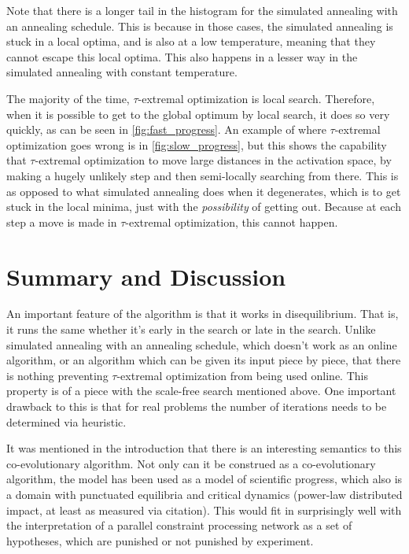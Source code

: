 \documentclass[12pt]{article}
\begin{document}
Note that there is a longer tail in the histogram for the simulated annealing with an annealing schedule. This is because in those cases, the simulated annealing is stuck in a local optima, and is also at a low temperature, meaning that they cannot escape this local optima. This also happens in a lesser way in the simulated annealing with constant temperature.

The majority of the time, $\tau$-extremal optimization is local search. Therefore, when it is possible to get to the global optimum by local search, it does so very quickly, as can be seen in \ref{fig:fast_progress}. An example of where $\tau$-extremal optimization goes wrong is in \ref{fig:slow_progress}, but this shows the capability that $\tau$-extremal optimization to move large distances in the activation space, by making a hugely unlikely step and then semi-locally searching from there. This is as opposed to what simulated annealing does when it degenerates, which is to get stuck in the local minima, just with the \emph{possibility} of getting out. Because at each step a move is made in $\tau$-extremal optimization, this cannot happen.

\section{Summary and Discussion}
An important feature of the algorithm is that it works in disequilibrium\cite{boettcher}. That is, it runs the same whether it's early in the search or late in the search. Unlike simulated annealing with an annealing schedule, which doesn't work as an online algorithm, or an algorithm which can be given its input piece by piece, that there is nothing preventing $\tau$-extremal optimization from being used online. This property is of a piece with the scale-free search mentioned above. One important drawback to this is that for real problems the number of iterations needs to be determined via heuristic.

It was mentioned in the introduction that there is an interesting semantics to this co-evolutionary algorithm. Not only can it be construed as a co-evolutionary algorithm, the model has been used as a model of scientific progress\cite{bakscience}, which also is a domain with punctuated equilibria and critical dynamics (power-law distributed impact, at least as measured via citation\cite{citationpowerlaw}). This would fit in surprisingly well with the interpretation of a parallel constraint processing network as a set of hypotheses, which are punished or not punished by experiment.
\end{document}

